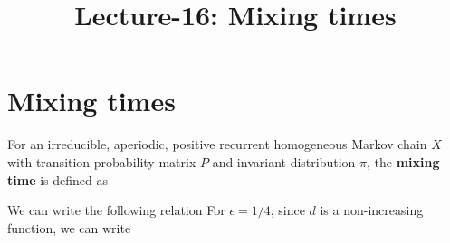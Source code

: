 \documentclass[letterpaper,english,10pt]{article}
\title{Lecture-16: Mixing times}
\begin{document}
\maketitle

\section{Mixing times}
\begin{defn}
For an irreducible, aperiodic, positive recurrent homogeneous Markov chain $X$ with transition probability matrix $P$ and invariant distribution $\pi$, 
the \textbf{mixing time} is defined as 
\end{defn}
We can write the following relation 
For $\epsilon = 1/4$, since $d$ is a non-increasing function, %
we can write 
\end{document}
